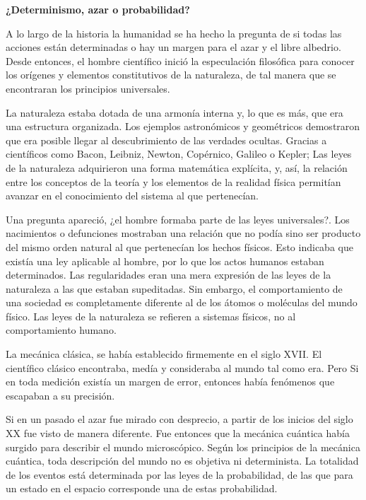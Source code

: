 \documentclass{article}[12pt]
\begin{document}
  
    \begin{center}
        \large \textbf{¿Determinismo, azar o probabilidad?}
    \end{center}
    
    A lo largo de la historia la humanidad se ha hecho la pregunta de si todas las acciones están determinadas o hay un margen para el azar y el libre albedrio. Desde entonces, el hombre científico inició la especulación filosófica para conocer los orígenes y elementos constitutivos de la naturaleza, de tal manera que se encontraran los principios universales.

    La naturaleza estaba dotada de una armonía interna y, lo que es más, que era una estructura organizada. Los ejemplos astronómicos y geométricos demostraron que era posible llegar al descubrimiento de las verdades ocultas. Gracias a científicos como Bacon, Leibniz, Newton, Copérnico, Galileo o Kepler; Las leyes de la naturaleza adquirieron una forma matemática explícita, y, así, la relación entre los conceptos de la teoría y los elementos de la realidad física permitían avanzar en el conocimiento del sistema al que pertenecían.

    Una pregunta apareció, ¿el hombre formaba parte de las leyes universales?.  Los nacimientos o defunciones mostraban una relación que no podía sino ser producto del mismo orden natural al que pertenecían los hechos físicos. Esto indicaba que existía una ley aplicable al hombre, por lo que los actos humanos estaban determinados. Las regularidades eran una mera expresión de las leyes de la naturaleza a las que estaban supeditadas. Sin embargo, el comportamiento de una sociedad es completamente diferente al de los átomos o moléculas del mundo físico. Las leyes de la naturaleza se refieren a sistemas físicos, no al comportamiento humano.

    La mecánica clásica, se había establecido firmemente en el siglo XVII. El científico clásico encontraba, medía y consideraba al mundo tal como era. Pero Si en toda medición existía un margen de error, entonces había fenómenos que escapaban a su precisión. 

    Si en un pasado el azar fue mirado con desprecio, a partir de los inicios del siglo XX fue visto de manera diferente.  Fue entonces que la mecánica cuántica había surgido para describir el mundo microscópico. Según los principios de la mecánica cuántica, toda descripción del mundo no es objetiva ni determinista.  La totalidad de los eventos está determinada por las leyes de la probabilidad, de las que para un estado en el espacio corresponde una de estas probabilidad.
\end{document}
